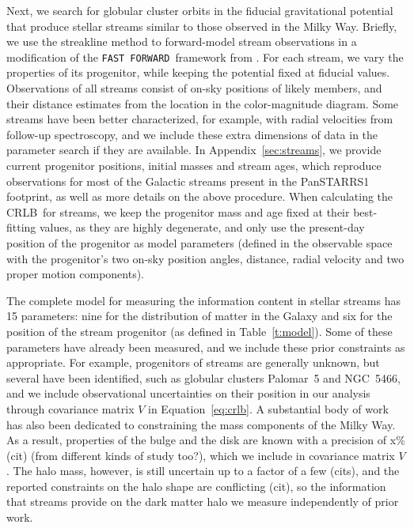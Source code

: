 \documentclass[modern]{aastex61}
\newcommand{\acronym}[1]{{\small{#1}}}
\newcommand{\CRLB}{\acronym{CRLB}}
\newcommand{\FF}{\texttt{FAST FORWARD}}
\begin{document}
Next, we search for globular cluster orbits in the fiducial gravitational potential that produce stellar streams similar to those observed in the Milky Way.
Briefly, we use the streakline method to forward-model stream observations in a modification of the \FF\ framework from \citet{bonaca2014}.
For each stream, we vary the properties of its progenitor, while keeping the potential fixed at fiducial values.
Observations of all streams consist of on-sky positions of likely members, and their distance estimates from the location in the color-magnitude diagram.
Some streams have been better characterized, for example, with radial velocities from follow-up spectroscopy, and we include these extra dimensions of data in the parameter search if they are available.
In Appendix~\ref{sec:streams}, we provide current progenitor positions, initial masses and stream ages, which reproduce observations for most of the Galactic streams present in the PanSTARRS1 footprint, as well as more details on the above procedure.
When calculating the \CRLB\ for streams, we keep the progenitor mass and age fixed at their best-fitting values, as they are highly degenerate, and only use the present-day position of the progenitor as model parameters (defined in the observable space with the progenitor's two on-sky position angles, distance, radial velocity and two proper motion components). 

The complete model for measuring the information content in stellar streams has 15 parameters: nine for the distribution of matter in the Galaxy and six for the position of the stream progenitor (as defined in Table~\ref{t:model}).
Some of these parameters have already been measured, and we include these prior constraints as appropriate. 
For example, progenitors of streams are generally unknown, but several have been identified, such as globular clusters Palomar~5 and NGC~5466, and we include observational uncertainties on their position in our analysis through covariance matrix $V$ in Equation~\ref{eq:crlb}.
A substantial body of work has also been dedicated to constraining the mass components of the Milky Way.
As a result, properties of the bulge and the disk are known with a precision of x\% (cit) (from different kinds of study too?), which we include in covariance matrix $V$.
The halo mass, however, is still uncertain up to a factor of a few (cits), and the reported constraints on the halo shape are conflicting (cit), so the information that streams provide on the dark matter halo we measure independently of prior work.
\end{document}

